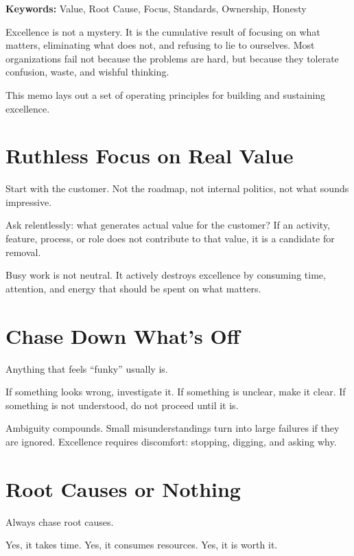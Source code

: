 \textbf{Keywords:} Value, Root Cause, Focus, Standards, Ownership,
Honesty

Excellence is not a mystery. It is the cumulative result of focusing on
what matters, eliminating what does not, and refusing to lie to
ourselves. Most organizations fail not because the problems are hard,
but because they tolerate confusion, waste, and wishful thinking.

This memo lays out a set of operating principles for building and
sustaining excellence.

\section{Ruthless Focus on Real
Value}\label{ruthless-focus-on-real-value}

Start with the customer. Not the roadmap, not internal politics, not
what sounds impressive.

Ask relentlessly: what generates actual value for the customer? If an
activity, feature, process, or role does not contribute to that value,
it is a candidate for removal.

Busy work is not neutral. It actively destroys excellence by consuming
time, attention, and energy that should be spent on what matters.

\section{Chase Down What's Off}\label{chase-down-whats-off}

Anything that feels ``funky'' usually is.

If something looks wrong, investigate it. If something is unclear, make
it clear. If something is not understood, do not proceed until it is.

Ambiguity compounds. Small misunderstandings turn into large failures if
they are ignored. Excellence requires discomfort: stopping, digging, and
asking why.

\section{Root Causes or Nothing}\label{root-causes-or-nothing}

Always chase root causes.

Yes, it takes time. Yes, it consumes resources. Yes, it is worth it.

